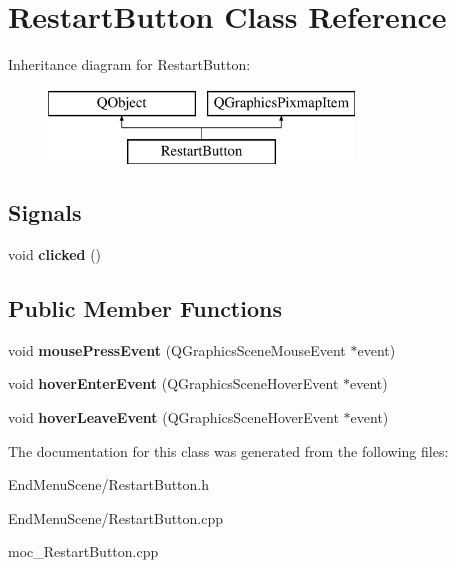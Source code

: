 \hypertarget{classRestartButton}{}\section{Restart\+Button Class Reference}
\label{classRestartButton}
Inheritance diagram for Restart\+Button\+:\begin{figure}[H]
\begin{center}
\leavevmode
\includegraphics[height=2.000000cm]{classRestartButton}
\end{center}
\end{figure}
\subsection*{Signals}
\begin{DoxyCompactItemize}
\item 
void {\bfseries clicked} ()\hypertarget{classRestartButton_a9684d51fa4f34cbee2acfd80b41c95db}{}\label{classRestartButton_a9684d51fa4f34cbee2acfd80b41c95db}

\end{DoxyCompactItemize}
\subsection*{Public Member Functions}
\begin{DoxyCompactItemize}
\item 
void {\bfseries mouse\+Press\+Event} (Q\+Graphics\+Scene\+Mouse\+Event $\ast$event)\hypertarget{classRestartButton_ab67d3a7e6316985547eb6e02d4075bdb}{}\label{classRestartButton_ab67d3a7e6316985547eb6e02d4075bdb}

\item 
void {\bfseries hover\+Enter\+Event} (Q\+Graphics\+Scene\+Hover\+Event $\ast$event)\hypertarget{classRestartButton_adcad7b3dabbb5a645b13708a24e1cb26}{}\label{classRestartButton_adcad7b3dabbb5a645b13708a24e1cb26}

\item 
void {\bfseries hover\+Leave\+Event} (Q\+Graphics\+Scene\+Hover\+Event $\ast$event)\hypertarget{classRestartButton_ac71ab26cfefad7ee2214b110bb304138}{}\label{classRestartButton_ac71ab26cfefad7ee2214b110bb304138}

\end{DoxyCompactItemize}


The documentation for this class was generated from the following files\+:\begin{DoxyCompactItemize}
\item 
End\+Menu\+Scene/Restart\+Button.\+h\item 
End\+Menu\+Scene/Restart\+Button.\+cpp\item 
moc\+\_\+\+Restart\+Button.\+cpp\end{DoxyCompactItemize}
